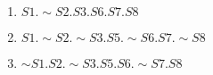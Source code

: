 \begin{latin}
\begin{enumerate}
    \item $S1.\sim{S2}.S3.S6.S7.S8$
    \item $S1.\sim{S2}.\sim{S3}.S5.\sim{S6}.S7.\sim{S8}$
    \item $\sim{S1}.S2.\sim{S3}.S5.S6.\sim{S7}.S8$
\end{enumerate}
\end{latin}